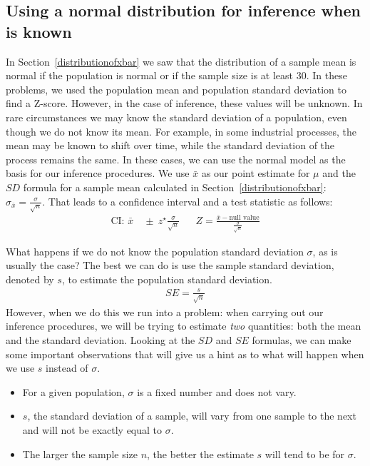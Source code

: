 \subsection[Using a normal distribution for inference when $\sigma$ is known]{Using a normal distribution for inference when \pmb{$\sigma$} is known}
\label{nearlyNormalPopWithKnownSD}

In Section~\ref{distributionofxbar} we saw that the distribution of a sample mean is normal if the population is normal or if the sample size is at least 30. In these problems, we used the population mean and population standard deviation to find a Z-score. However, in the case of inference, these values will be unknown. In rare circumstances we may know the standard deviation of a population, even though we do not know its mean. For example, in some industrial processes, the mean may be known to shift over time, while the standard deviation of the process remains the same. In these cases, we can use the normal model as the basis for our inference procedures. We use $\bar{x}$ as our point estimate for $\mu$ and the $SD$ formula for a sample mean calculated in Section~\ref{distributionofxbar}: $\sigma_{\bar{x}} =\frac{\sigma}{\sqrt{n}}$.  That leads to a confidence interval and a test statistic as follows:
\begin{align*}
\text{CI:  } \bar{x} &\ \pm \ z^{\star}\frac{\sigma}{\sqrt{n}}
&&Z = \frac{\bar{x} - \text{null value}}{\frac{\sigma}{\sqrt{n}}}
\end{align*}

What happens if we do not know the population standard deviation $\sigma$, as is usually the case?  The best we can do is use the sample standard deviation, denoted by $s$, to estimate the population standard deviation.
\begin{align*}
SE= \frac{s}{\sqrt{n}}
\end{align*}
However, when we do this we run into a problem:  when carrying out our inference procedures, we will be trying to estimate \emph{two} quantities: both the mean and the standard deviation. Looking at the $SD$ and $SE$ formulas, we can make some important observations that will give us a hint as to what will happen when we use $s$ instead of $\sigma$.
\begin{itemize}
\setlength{\itemsep}{0mm}
\item For a given population, $\sigma$ is a fixed number and does not vary.
\item $s$, the standard deviation of a sample, will vary from one sample to the next and will not be exactly equal to $\sigma$.
\item The larger the sample size $n$, the better the estimate $s$ will tend to be for $\sigma$.
\end{itemize}

